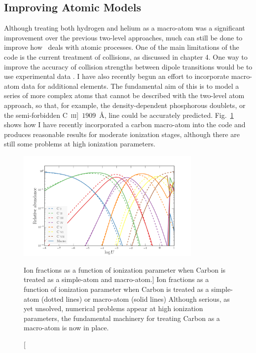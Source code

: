 \subsection{Improving Atomic Models}

Although treating both hydrogen and helium as a macro-atom was
a significant improvement over the previous two-level approaches, 
much can still be done to improve how \py\ deals with atomic processes.
One of the main limitations of the code is the current treatment of
collisions, as discussed in chapter 4. One way to improve the accuracy
of collision strengths between dipole transitions would be to use
experimental data \citep[e.g.][]{gaetz1983}.
I have also recently begun an effort to incorporate macro-atom data for
additional elements. The fundamental aim of this is to
model a series of more complex atoms that cannot be described
with the two-level atom approach, so that, for example, the density-dependent 
phosphorous doublets, or the semi-forbidden C~\textsc{iii}]~$1909$~\AA, 
line could be accurately predicted. 
Fig.~\ref{fig:carbon_matom} shows how I have recently incorporated a carbon macro-atom
into the code and produces reasonable results for moderate
ionization stages, although there are still some problems at high ionization parameters.

\begin{figure} 
\centering
\includegraphics[width=0.8\textwidth]{figures/ewpaper/carbon_matom_ion.png}
\caption
[Ion fractions as a function of ionization parameter when 
Carbon is treated as a simple-atom and macro-atom.]
{
Ion fractions as a function of ionization parameter when 
Carbon is treated as a simple-atom (dotted lines) or macro-atom (solid lines)
Although serious, as yet unsolved, numerical problems appear at 
high ionization parameters, the fundamental machinery for treating
Carbon as a macro-atom is now in place.
}
\label{fig:carbon_matom}
\end{figure} 


